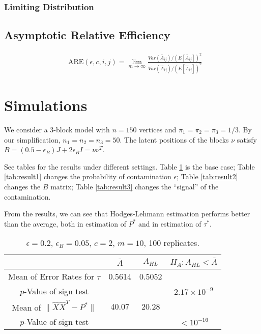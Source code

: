 \documentclass[a4paper]{article}
\begin{document}
\subsubsection{Limiting Distribution}







\subsection{Asymptotic Relative Efficiency}

\begin{align*}
	& \text{ARE}(\epsilon, c, i, j) =  \lim_{m \rightarrow \infty}
    \frac{Var(\bar{A}_{ij})/\left( E[\bar{A}_{ij}] \right)^2}{Var(\hat{A}_{ij})/\left( E[\hat{A}_{ij}] \right)^2}
\end{align*}








\section{Simulations}

We consider a 3-block model with $n = 150$ vertices and $\pi_1 = \pi_2 = \pi_3 = 1/3$. By our simplification, $n_1 = n_2 = n_3 = 50$. The latent positions of the blocks $\nu$ satisfy $B = (0.5 - \epsilon_B) J + 2 \epsilon_B I = \nu \nu^T$.

See tables for the results under different settings. Table \ref{tab:result0} is the base case; Table \ref{tab:result1} changes the probability of contamination $\epsilon$; Table \ref{tab:result2} changes the $B$ matrix; Table \ref{tab:result3} changes the ``signal'' of the contamination.

From the results, we can see that Hodges-Lehmann estimation performs better than the average, both in estimation of $P^*$ and in estimation of $\tau^*$.


\newpage

\begin{table}
\centering
\begin{tabular}{c|c|c|c}
& $\bar{A}$ & $A_{HL}$ & $H_A: A_{HL} < \bar{A}$ \\\hline
Mean of Error Rates for $\widehat{\tau}$ & 0.5614 & 0.5052 & \\
$p$-Value of sign test & & & $2.17 \times 10^{-9}$ \\\hline
Mean of $\|\hat{X}\hat{X}^T - P^*\|$ & 40.07 & 20.28 & \\
$p$-Value of sign test & & & $ < 10^{-16}$\\
\end{tabular}
\caption{\label{tab:result0}$\epsilon = 0.2$, $\epsilon_B = 0.05$, $c = 2$, $m = 10$, 100 replicates.}
\end{table}
\end{document}
